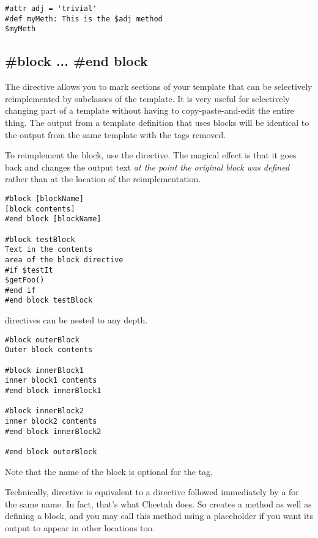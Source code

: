 \begin{verbatim}
#attr adj = 'trivial'
#def myMeth: This is the $adj method 
$myMeth
\end{verbatim}


\subsection{\#block ... \#end block}
\label{inheritanceEtc.block}

The  directive allows you to mark sections of your template
that can be selectively reimplemented by subclasses of the template.  It is
very useful for selectively changing part of a template without having to
copy-paste-and-edit the entire thing.  The output from a template definition
that uses blocks will be identical to the output from the same template with
the  tags removed. 

To reimplement the block, use the  directive.  The magical effect is that it
goes back and changes the output text {\em at the point the original block was
defined} rather than at the location of the reimplementation.

\begin{verbatim}
#block [blockName] 
[block contents] 
#end block [blockName]

#block testBlock
Text in the contents 
area of the block directive
#if $testIt
$getFoo() 
#end if
#end block testBlock
\end{verbatim}

 directives can be nested to any depth.

\begin{verbatim}
#block outerBlock
Outer block contents 

#block innerBlock1
inner block1 contents 
#end block innerBlock1

#block innerBlock2
inner block2 contents 
#end block innerBlock2

#end block outerBlock
\end{verbatim}

Note that the name of the block is optional for the  tag.

Technically,  directive is equivalent to a  directive
followed immediately by a  for the same name.  In fact,
that's what Cheetah does.  So  creates a method as well as
defining a block, and you may call this method using a placeholder if you want
its output to appear in other locations too.


